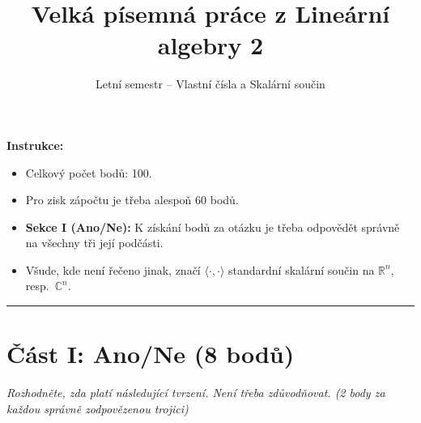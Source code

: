 \documentclass[a4paper,11pt]{article}
\title{\textbf{Velká písemná práce z Lineární algebry 2}}
\author{Letní semestr -- Vlastní čísla a Skalární součin}
\date{}
\begin{document}
\maketitle

\noindent \textbf{Instrukce:}
\begin{itemize}
    \item Celkový počet bodů: 100.
    \item Pro zisk zápočtu je třeba alespoň 60 bodů.
    \item \textbf{Sekce I (Ano/Ne):} K získání bodů za otázku je třeba odpovědět správně na všechny tři její podčásti.
    \item Všude, kde není řečeno jinak, značí $\langle \cdot, \cdot \rangle$ standardní skalární součin na $\mathbb{R}^n$, resp.\ $\mathbb{C}^n$.
\end{itemize}

\hrule
\vspace{0.5cm}

\section*{Část I: Ano/Ne (8 bodů)}
\textit{Rozhodněte, zda platí následující tvrzení. Není třeba zdůvodňovat. (2 body za každou správně zodpovězenou trojici)}
\end{document}
